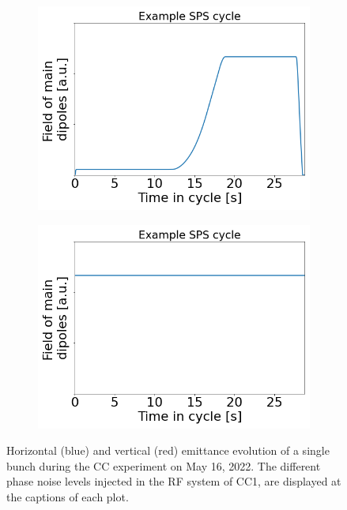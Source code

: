  \begin{figure}[htp]
    \centering
    \begin{subfigure}{.45\textwidth}
        \centering
        \includegraphics[width=.95\linewidth]{images/introduction/MD4_cycle_16May2022_aribtrary_units_for_thesis.png}  
    \end{subfigure}
    \begin{subfigure}{.45\textwidth}
        \centering
        \includegraphics[width=.95\linewidth]{images/introduction/MD4_cycle_13Oct2021_coast_aribtrary_units_for_thesis.png}  
    \end{subfigure}
    \caption{Horizontal (blue) and vertical (red) emittance evolution of a single bunch during the CC experiment on May 16, 2022. The different phase noise levels injected in the RF system of CC1, are displayed at the captions of each plot.}
    \label{fig:example_sps_cycles}
 \end{figure}


